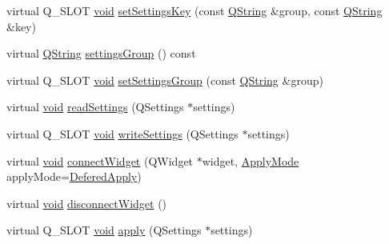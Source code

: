 \begin{DoxyCompactItemize}
\item 
virtual \-Q\-\_\-\-S\-L\-O\-T \hyperlink{group___u_a_v_objects_plugin_ga444cf2ff3f0ecbe028adce838d373f5c}{void} \hyperlink{class_utils_1_1_saved_action_a105d85462675a59292570f6de41faf7d}{set\-Settings\-Key} (const \hyperlink{group___u_a_v_objects_plugin_gab9d252f49c333c94a72f97ce3105a32d}{\-Q\-String} \&group, const \hyperlink{group___u_a_v_objects_plugin_gab9d252f49c333c94a72f97ce3105a32d}{\-Q\-String} \&key)
\item 
virtual \hyperlink{group___u_a_v_objects_plugin_gab9d252f49c333c94a72f97ce3105a32d}{\-Q\-String} \hyperlink{class_utils_1_1_saved_action_afa3559d7166402cf75ba466f10f16140}{settings\-Group} () const 
\item 
virtual \-Q\-\_\-\-S\-L\-O\-T \hyperlink{group___u_a_v_objects_plugin_ga444cf2ff3f0ecbe028adce838d373f5c}{void} \hyperlink{class_utils_1_1_saved_action_acbc43194d58d458373ad8b4df4ef091d}{set\-Settings\-Group} (const \hyperlink{group___u_a_v_objects_plugin_gab9d252f49c333c94a72f97ce3105a32d}{\-Q\-String} \&group)
\item 
virtual \hyperlink{group___u_a_v_objects_plugin_ga444cf2ff3f0ecbe028adce838d373f5c}{void} \hyperlink{class_utils_1_1_saved_action_a42f64ef2508f9baa33da4f0c37db670c}{read\-Settings} (\-Q\-Settings $\ast$settings)
\item 
virtual \-Q\-\_\-\-S\-L\-O\-T \hyperlink{group___u_a_v_objects_plugin_ga444cf2ff3f0ecbe028adce838d373f5c}{void} \hyperlink{class_utils_1_1_saved_action_abe287a9257381ac7fe3d08128380cd24}{write\-Settings} (\-Q\-Settings $\ast$settings)
\item 
virtual \hyperlink{group___u_a_v_objects_plugin_ga444cf2ff3f0ecbe028adce838d373f5c}{void} \hyperlink{class_utils_1_1_saved_action_a957c40a1ba916fd9f3073bfab6d22dd2}{connect\-Widget} (\-Q\-Widget $\ast$widget, \hyperlink{namespace_utils_ac2d001247aaff664db3acdb312344458}{\-Apply\-Mode} apply\-Mode=\hyperlink{namespace_utils_ac2d001247aaff664db3acdb312344458a6081d5dba39502dab03be7d2eb297166}{\-Defered\-Apply})
\item 
virtual \hyperlink{group___u_a_v_objects_plugin_ga444cf2ff3f0ecbe028adce838d373f5c}{void} \hyperlink{class_utils_1_1_saved_action_af7478eb16c4cbd16e49d303a13cb1c03}{disconnect\-Widget} ()
\item 
virtual \-Q\-\_\-\-S\-L\-O\-T \hyperlink{group___u_a_v_objects_plugin_ga444cf2ff3f0ecbe028adce838d373f5c}{void} \hyperlink{class_utils_1_1_saved_action_a55ba45bf726930f8ad0beac52ae4f831}{apply} (\-Q\-Settings $\ast$settings)
\item 

\end{DoxyCompactItemize}
